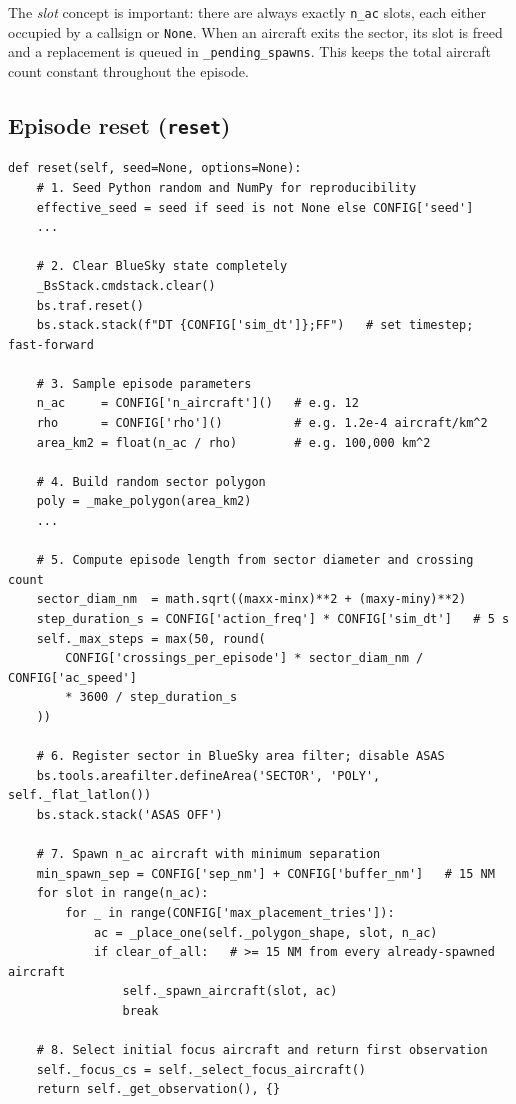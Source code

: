 \documentclass[11pt, a4paper]{article}
\begin{document}
The \textit{slot} concept is important: there are always exactly \texttt{n\_ac}
slots, each either occupied by a callsign or \texttt{None}.
When an aircraft exits the sector, its slot is freed and a replacement is queued
in \texttt{\_pending\_spawns}.
This keeps the total aircraft count constant throughout the episode.

\subsection{Episode reset (\texttt{reset})}

\begin{lstlisting}[caption={Key steps in \texttt{reset()}.}]
def reset(self, seed=None, options=None):
    # 1. Seed Python random and NumPy for reproducibility
    effective_seed = seed if seed is not None else CONFIG['seed']
    ...

    # 2. Clear BlueSky state completely
    _BsStack.cmdstack.clear()
    bs.traf.reset()
    bs.stack.stack(f"DT {CONFIG['sim_dt']};FF")   # set timestep; fast-forward

    # 3. Sample episode parameters
    n_ac     = CONFIG['n_aircraft']()   # e.g. 12
    rho      = CONFIG['rho']()          # e.g. 1.2e-4 aircraft/km^2
    area_km2 = float(n_ac / rho)        # e.g. 100,000 km^2

    # 4. Build random sector polygon
    poly = _make_polygon(area_km2)
    ...

    # 5. Compute episode length from sector diameter and crossing count
    sector_diam_nm  = math.sqrt((maxx-minx)**2 + (maxy-miny)**2)
    step_duration_s = CONFIG['action_freq'] * CONFIG['sim_dt']   # 5 s
    self._max_steps = max(50, round(
        CONFIG['crossings_per_episode'] * sector_diam_nm / CONFIG['ac_speed']
        * 3600 / step_duration_s
    ))

    # 6. Register sector in BlueSky area filter; disable ASAS
    bs.tools.areafilter.defineArea('SECTOR', 'POLY', self._flat_latlon())
    bs.stack.stack('ASAS OFF')

    # 7. Spawn n_ac aircraft with minimum separation
    min_spawn_sep = CONFIG['sep_nm'] + CONFIG['buffer_nm']   # 15 NM
    for slot in range(n_ac):
        for _ in range(CONFIG['max_placement_tries']):
            ac = _place_one(self._polygon_shape, slot, n_ac)
            if clear_of_all:   # >= 15 NM from every already-spawned aircraft
                self._spawn_aircraft(slot, ac)
                break

    # 8. Select initial focus aircraft and return first observation
    self._focus_cs = self._select_focus_aircraft()
    return self._get_observation(), {}
\end{lstlisting}
\end{document}

